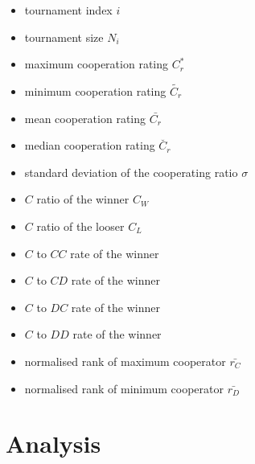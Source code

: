 \documentclass{article}
\begin{document}
\begin{multicols}{2}
    \begin{itemize}
        \item tournament index \(i\)
        \item tournament size \(N_{i}\)
        \item maximum cooperation rating \(C^{*}_{r}\)
        \item minimum cooperation rating  \(\tilde{C_{r}}\)
        \item mean cooperation rating \(\bar{C_{r}}\)
        \item median cooperation rating \(\breve{C_{r}}\)
        \item standard deviation of the cooperating ratio \(\sigma\)
        \item \(C\) ratio of the winner \(C_{W}\)
        \item \(C\) ratio of the looser \(C_{L}\)
        \item \(C\) to \(CC\) rate of the winner
        \item \(C\) to \(CD\) rate of the winner
        \item \(C\) to \(DC\) rate of the winner
        \item \(C\) to \(DD\) rate of the winner
        \item normalised rank of maximum cooperator \(\bar{r_{C}}\)
        \item normalised rank of minimum cooperator \(\bar{r_{D}}\)
    \end{itemize}
    \end{multicols}

\section{Analysis}




\end{document}
